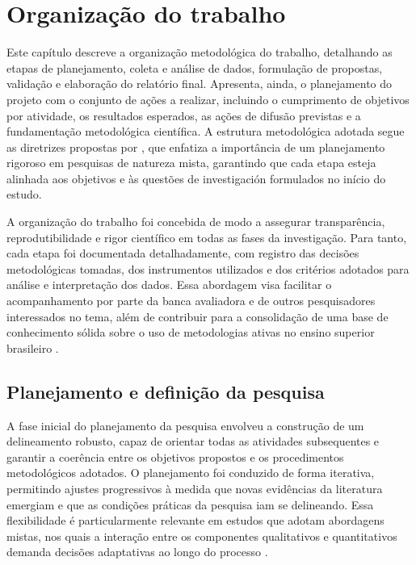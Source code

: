 
\chapter{Organização do trabalho}
\label{chap:organizacao_trabalho}

Este capítulo descreve a organização metodológica do trabalho, detalhando as etapas de planejamento, coleta e análise de dados, formulação de propostas, validação e elaboração do relatório final. Apresenta, ainda, o planejamento do projeto com o conjunto de ações a realizar, incluindo o cumprimento de objetivos por atividade, os resultados esperados, as ações de difusão previstas e a fundamentação metodológica científica. A estrutura metodológica adotada segue as diretrizes propostas por \cite{CRESWELL2018}, que enfatiza a importância de um planejamento rigoroso em pesquisas de natureza mista, garantindo que cada etapa esteja alinhada aos objetivos e às questões de investigación formulados no início do estudo.

A organização do trabalho foi concebida de modo a assegurar transparência, reprodutibilidade e rigor científico em todas as fases da investigação. Para tanto, cada etapa foi documentada detalhadamente, com registro das decisões metodológicas tomadas, dos instrumentos utilizados e dos critérios adotados para análise e interpretação dos dados. Essa abordagem visa facilitar o acompanhamento por parte da banca avaliadora e de outros pesquisadores interessados no tema, além de contribuir para a consolidação de uma base de conhecimento sólida sobre o uso de metodologias ativas no ensino superior brasileiro \cite{SANTOS2024}.

\section{Planejamento e definição da pesquisa}
\label{sec:planejamento_pesquisa}

A fase inicial do planejamento da pesquisa envolveu a construção de um delineamento robusto, capaz de orientar todas as atividades subsequentes e garantir a coerência entre os objetivos propostos e os procedimentos metodológicos adotados. O planejamento foi conduzido de forma iterativa, permitindo ajustes progressivos à medida que novas evidências da literatura emergiam e que as condições práticas da pesquisa iam se delineando. Essa flexibilidade é particularmente relevante em estudos que adotam abordagens mistas, nos quais a interação entre os componentes qualitativos e quantitativos demanda decisões adaptativas ao longo do processo \cite{CRESWELL2018}.


